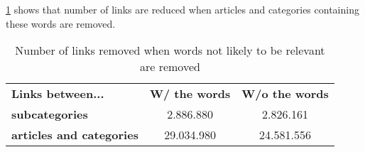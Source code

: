 

\ref{tab:removed_irrelevant_words} shows that number of links are reduced when articles and categories containing these words are removed. 

\begin{table}[h]
\centering
\begin{tabular}{l|c|c}
\textbf{Links between...} & \textbf{W/ the words} & \textbf{W/o the words} \\
 \textbf{subcategories}& 2.886.880 & 2.826.161 \\
 \textbf{articles and categories} & 29.034.980 & 24.581.556
\end{tabular}
\caption{Number of links removed when words not likely to be relevant are removed }
\label{tab:removed_irrelevant_words}
\end{table}